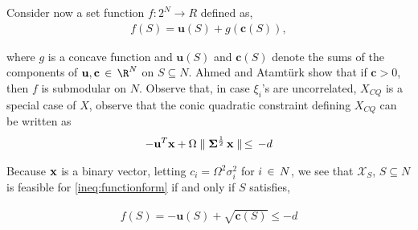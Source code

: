 \documentclass[10pt,twoside]{amsart}
\begin{document}
Consider now a set function $f : 2^N \rightarrow R$ defined as,
\begin{align}
\label{function:f}
	f(S) = \mathbf{u}(S) + g(\mathbf{c}(S)),
\end{align}

where $g$ is a concave function and $\mathbf{u}(S)$ and $\mathbf{c}(S)$ denote the sums of the components of $\mathbf{u}, \mathbf{c}\inset {\R}^N$ on $S\subseteq N$. Ahmed and Atamt\"{u}rk \cite{Ahmed2011} show that if $\mathbf{c} > 0$, then $f$ is submodular on $N$. Observe that, in case $\xi_i$'s are uncorrelated, $X_{CQ}$ is a special case of $X$, observe that the conic quadratic constraint defining $X_{CQ}$ can be written as
\begin{align}
\label{ineq:functionform}
	-\mathbf{u}^T\mathbf{x} + \Omega\parallel\mathbf{\Sigma}^{\frac{1}{2}}\,\mathbf{x}\parallel\, \leq\, - d
\end{align}

Because $\mathbf{x}$ is a binary vector, letting $c_i = \Omega^2 \sigma^2_i$ for $i\,\in\, N$, we see that $\mathcal{X}_S$,  $S \subseteq N$ is feasible for \eqref{ineq:functionform} if and only if $S$ satisfies,

\begin{align}
	f(S) =  -\mathbf{u}(S) + \sqrt{\mathbf{c}(S)} \leq -d
\end{align}
\end{document}

